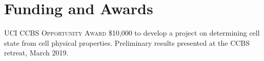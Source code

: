\documentclass[letterpaper,10pt]{article} %
\begin{document}

\section*{Funding and Awards}
\bigskip

\begin{description}
\item \textsc{UCI CCBS Opportunity Award} \$10,000 to develop a project on determining cell state from cell physical properties. Preliminary results presented at the CCBS retreat, March 2019.
\end{description}
\end{document}

